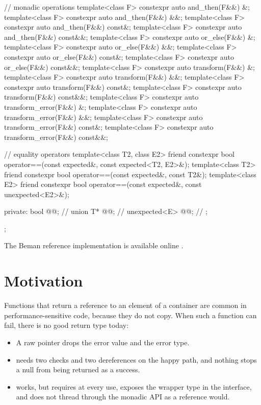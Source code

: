 \documentclass[a4paper,10pt,oneside,openany,final,article]{memoir}
\begin{document}
\begin{codeblock}
{{    // monadic operations
    template<class F>
    constexpr auto and_then(F&&) &;
    template<class F>
    constexpr auto and_then(F&&) &&;
    template<class F>
    constexpr auto and_then(F&&) const&;
    template<class F>
    constexpr auto and_then(F&&) const&&;
    template<class F>
    constexpr auto or_else(F&&) &;
    template<class F>
    constexpr auto or_else(F&&) &&;
    template<class F>
    constexpr auto or_else(F&&) const&;
    template<class F>
    constexpr auto or_else(F&&) const&&;
    template<class F>
    constexpr auto transform(F&&) &;
    template<class F>
    constexpr auto transform(F&&) &&;
    template<class F>
    constexpr auto transform(F&&) const&;
    template<class F>
    constexpr auto transform(F&&) const&&;
    template<class F>
    constexpr auto transform_error(F&&) &;
    template<class F>
    constexpr auto transform_error(F&&) &&;
    template<class F>
    constexpr auto transform_error(F&&) const&;
    template<class F>
    constexpr auto transform_error(F&&) const&&;

    // equality operators
    template<class T2, class E2>
    friend constexpr bool operator==(const expected&, const expected<T2, E2>&);
    template<class T2>
    friend constexpr bool operator==(const expected&, const T2&);
    template<class E2>
    friend constexpr bool operator==(const expected&, const unexpected<E2>&);

  private:
    bool @@;   // \expos
    union {
        T* @@;     // \expos
        unexpected<E> @@; // \expos
    };
};
}
\end{codeblock}

The Beman reference implementation is available online
\cite{Downey_beman_expected}.

\chapter{Motivation}

Functions that return a reference to an element of a container are common in
performance-sensitive code, because they do not copy. When such a
function can fail, there is no good return type today:

\begin{itemize}
\item A raw pointer drops the error value and the error type.
\item {} needs two checks and two dereferences on the
  happy path, and nothing stops a null  from being returned as a
  success.
\item {} works, but requires
   at every use, exposes the wrapper type in the interface, and
  does not thread through the monadic API as a reference would.
\end{itemize}
\end{document}
